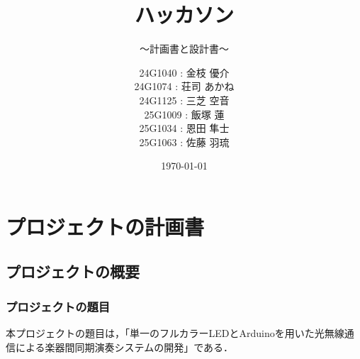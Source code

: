\documentclass[lualatex,book,openany,paper=a4paper,jafontsize=11.5pt,jafontscale=1.05]{jlreq}
\title{ハッカソン}
\subtitle{～計画書と設計書～}
\author{
        24G1040 : 金枝 優介\\
        24G1074 :  荘司 あかね\\
        24G1125 : 三芝 空音\\
	25G1009 : 飯塚 蓮\\
        25G1034 : 恩田 隼士\\
        25G1063 : 佐藤 羽琉
        }
\date{\today}
\begin{document}
\maketitle %

\setcounter{tocdepth}{2}
\tableofcontents \thispagestyle{empty} %

\chapter{プロジェクトの計画書} \label{chap:project-plan}\setcounter{page}{1} %

\section{プロジェクトの概要}
\subsection{プロジェクトの題目}
本プロジェクトの題目は，「単一のフルカラーLEDとArduinoを用いた光無線通信による楽器間同期演奏システムの開発」である．
\end{document}
